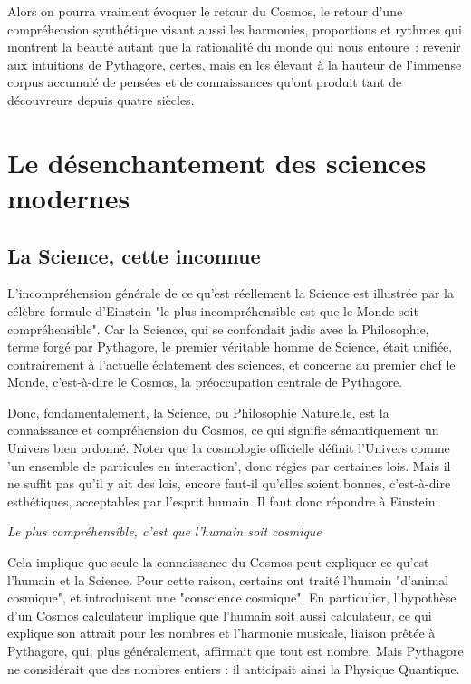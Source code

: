 \documentclass[a4paper,12pt]{article}
\begin{document}
  Alors on pourra vraiment évoquer le retour du Cosmos, le retour d’une compréhension synthétique visant aussi les harmonies, proportions et rythmes qui montrent la beauté autant que la rationalité du monde qui nous entoure : revenir aux intuitions de Pythagore, certes, mais en les élevant à la hauteur de l’immense corpus accumulé de pensées et de connaissances qu’ont produit tant de découvreurs depuis quatre siècles. 









\section{Le désenchantement des sciences modernes}


\subsection{La Science, cette inconnue}

L'incompréhension générale de ce qu'est réellement la Science est illustrée par la célèbre formule d'Einstein "le plus incompréhensible est que le Monde soit compréhensible". Car la Science, qui se confondait jadis avec la Philosophie, terme forgé par Pythagore, le premier véritable homme de Science,  était unifiée, contrairement à l'actuelle éclatement des sciences, et concerne au premier chef le Monde, c'est-à-dire le Cosmos, la préoccupation centrale de Pythagore.

Donc, fondamentalement, la Science, ou Philosophie Naturelle, est la connaissance et compréhension du Cosmos, ce qui signifie sémantiquement un Univers bien ordonné. Noter que la cosmologie officielle définit l'Univers comme 'un ensemble de particules en interaction', donc régies par certaines lois. Mais il ne suffit pas qu'il y ait des lois, encore faut-il qu'elles soient bonnes, c'est-à-dire esthétiques,  acceptables par l'esprit humain. Il faut donc répondre à Einstein:

\textit {Le plus compréhensible, c'est que l'humain soit cosmique}

Cela implique que seule la connaissance du Cosmos peut expliquer ce qu'est l'humain et la Science. Pour cette raison, certains ont traité l'humain "d'animal cosmique", et introduisent une "conscience cosmique". En particulier, l'hypothèse d'un Cosmos calculateur implique que l'humain soit aussi calculateur, ce qui explique son attrait pour les nombres et l'harmonie musicale, liaison prêtée à Pythagore, qui, plus généralement, affirmait que tout est nombre. Mais Pythagore ne considérait que des nombres entiers : il anticipait ainsi la Physique Quantique.  
\end{document}
